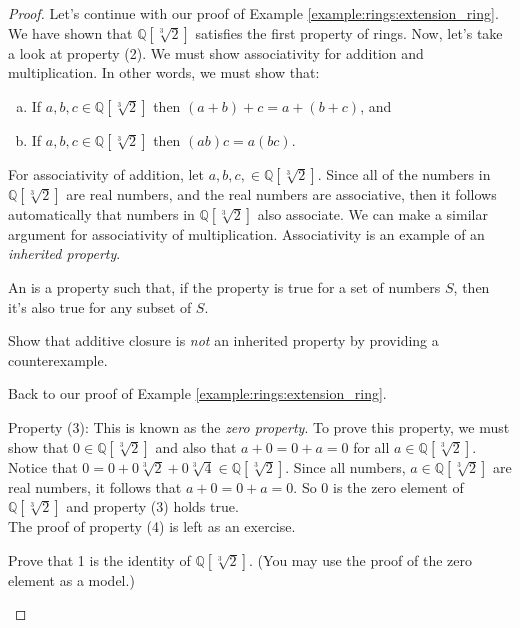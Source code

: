 \begin{example}
\begin{proof}
Let's continue with our proof of Example \ref{example:rings:extension_ring}. We have shown that ${\mathbb Q}[\sqrt[3]{2}]$ satisfies the first property of rings. Now, let's take a look at property (2). We must show associativity for addition and multiplication. In other words, we must show that:
\begin{enumerate}[(a)]
\item If $a,b,c\in{\mathbb Q}[\sqrt[3]{2}]$ then $(a+b)+c=a+(b+c)$, and
\item If $a,b,c\in{\mathbb Q}[\sqrt[3]{2}]$ then $(ab)c=a(bc)$.
\end{enumerate}

For associativity of addition, let $a,b,c,\in{\mathbb Q}[ \sqrt[3]{2}]$. Since all of the numbers in ${\mathbb Q}[\sqrt[3]{2}]$ are real numbers, and the real numbers are associative, then it follows automatically that numbers in ${\mathbb Q}[\sqrt[3]{2}]$ also associate.  We can make a similar argument for associativity of multiplication.  Associativity is an example of an \emph{inherited property}.

\begin{defn}\label{def:inherited property}
An  is a property such that, if the property is true for a set of numbers $S$, then it's also true for any subset of $S$.
\end{defn}

\begin{exercise}\label{exercise:rings:addClosureNotInherited}
Show that additive closure is \emph{not} an inherited property by providing a counterexample.
\end{exercise}{}

Back to our proof of Example \ref{example:rings:extension_ring}.

Property (3): This is known as the \emph{zero property}. To prove this property, we must show that $0\in{\mathbb Q}[\sqrt[3]{2}]$ and also that $a+0=0+a=0$ for all $a\in{\mathbb Q}[\sqrt[3]{2}]$. Notice that $0=0+0\sqrt[3]{2}+0\sqrt[3]{4}\in{\mathbb Q}[\sqrt[3]{2}]$. Since all numbers, $a\in{\mathbb Q}[\sqrt[3]{2}]$ are real numbers, it follows that $a+0=0+a=0$. So $0$ is the zero element of ${\mathbb Q}[\sqrt[3]{2}]$ and property (3) holds true.\\

The proof of property (4) is left as an exercise.

\begin{exercise}\label{exercise:rings:identityQcuberoot2}
Prove that 1 is the identity of ${\mathbb Q}[\sqrt[3]{2}]$. (You may use the proof of the zero element as a model.)  
\end{exercise}{}


\end{proof}
\end{example}
